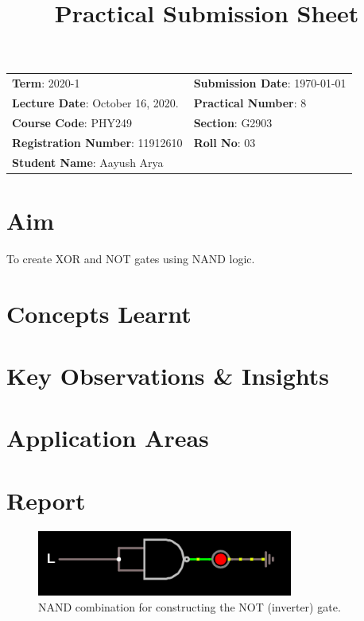 \documentclass{article}
\title{Practical Submission Sheet}
\date{}
\newcommand{\bb}[1]{\textbf{#1}}
\begin{document}
	\maketitle
	\begin{tabular}{ll}
		\bb{Term}: 2020-1 & \bb{Submission Date}: \today\\
		\bb{Lecture Date}: October 16, 2020. & \bb{Practical Number}: 8\\
		\bb{Course Code}: PHY249 & \bb{Section}: G2903\\
		\bb{Registration Number}: 11912610 & \bb{Roll No}: 03\\
		\bb{Student Name}: Aayush Arya & \\
	\end{tabular}
	
	\section*{Aim} To create XOR and NOT gates using NAND logic.

	\section*{Concepts Learnt}	
	
	
	\section*{Key Observations \& Insights}
	
	
	\section*{Application Areas}
	
	
	\section*{Report}
	
	\begin{figure}[H]
		\centering
		\includegraphics[width=0.75\textwidth]{NOT}
		\caption{NAND combination for constructing the NOT  (inverter) gate.}
		\label{circuit1}
	\end{figure}
	 
\end{document}

